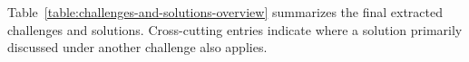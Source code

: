 Table~\ref{table:challenges-and-solutions-overview} summarizes the final extracted challenges and solutions. Cross-cutting entries indicate where a solution primarily discussed under another challenge also applies.

\clearpage
\begingroup
\footnotesize

\newcommand{\tablechallengeref}[2]{%
    \hyperref[challenge:#1]{#2}%
}
\newcommand{\tablesolutionref}[2]{%
    \hyperref[solution:#1]{#2}%
}
\newcommand{\tablecrosscuttingsolutionref}[2]{%
    \hyperref[solution:#1]{\textit{Cross-cutting:} #2}%
}

\setlength{\tabcolsep}{2pt}
\renewcommand{\arraystretch}{0.95}

\setlength{\LTpre}{2pt}
\setlength{\LTpost}{2pt}

\setlength{\aboverulesep}{1pt}
\setlength{\belowrulesep}{1pt}

\captionsetup{skip=3pt}


